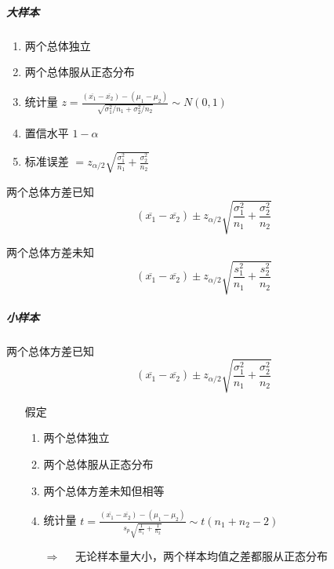 \documentclass[UTF8,10pt]{book}
\begin{document}
                    \subparagraph{大样本}   %
                        {\kaishu            %

                        \begin{enumerate}
                            \item 两个总体独立
                            \item 两个总体服从正态分布
                            \item 统计量 $  z = \frac{\left( \overline{x_1}-\overline{x_2} \right) - \left(\mu_1 - \mu_2\right)}{\sqrt{ \sigma_1^2 / n_1  +  \sigma_2^2 / n_2  }}  \sim N(0,1) $
                            \item 置信水平 $1-\alpha$                            
                            \item 标准误差 $  = z_{\alpha/2} \sqrt{  \frac{\sigma_1^2}{n_1} + \frac{\sigma_2^2}{n_2}   }  $
                        \end{enumerate}                                  
                        }
                        {\kaishu 两个总体方差已知}
                            $$\left( \overline{x_1}-\overline{x_2} \right)  \pm z_{\alpha/2} \sqrt{  \frac{\sigma_1^2}{n_1} + \frac{\sigma_2^2}{n_2}   }$$

                        {\kaishu 两个总体方差未知}
                            $$\left( \overline{x_1}-\overline{x_2} \right)  \pm z_{\alpha/2} \sqrt{  \frac{s_1^2}{n_1} + \frac{s_2^2}{n_2}   }$$




                    \subparagraph{小样本}

                        {\kaishu 两个总体方差已知}
                        $$\left( \overline{x_1}-\overline{x_2} \right)  \pm z_{\alpha/2} \sqrt{  \frac{\sigma_1^2}{n_1} + \frac{\sigma_2^2}{n_2}   }$$

                        \begin{itemize}
                            \item [假定]{
                            \begin{enumerate}
                                \item 两个总体独立
                                \item 两个总体服从正态分布
                                \item 两个总体方差未知但相等
                                \item 统计量 $ t = \frac{\left( \overline{x_1}-\overline{x_2} \right)  - \left(\mu_1-\mu_2\right)}{s_p \sqrt{  \frac{1}{n_1} + \frac{1}{n_2} }} \sim t(n_1+n_2-2)$
                            
                                $\Rightarrow \quad $ 无论样本量大小，两个样本均值之差都服从正态分布
                            \end{enumerate}
                            }
                        \end{itemize}
\end{document}
